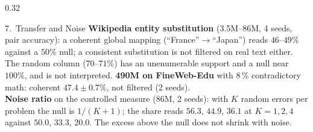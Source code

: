 \documentclass[final,t]{beamer}
\begin{document}
\begin{frame}[t,fragile]
\begin{columns}[t,totalwidth=\linewidth]
\begin{column}{0.32\linewidth}
\begin{block}{7.~Transfer and Noise}
\justifying\normalsize
\textbf{Wikipedia entity substitution} (3.5M--86M, 4 seeds, pair accuracy): a
coherent global mapping (``France''$\to$``Japan'') reads $46$--$49\%$ against
a $50\%$ null; a consistent substitution is not filtered on real text either.
The random column ($70$--$71\%$) has an unenumerable support and a null near
$100\%$, and is not interpreted. \textbf{490M on FineWeb-Edu} with 8\,\%
contradictory math: coherent $47.4 \pm 0.7\%$, not filtered (2 seeds).\\[0.3ex]
\textbf{Noise ratio} on the controlled measure (86M, 2 seeds): with $K$
random errors per problem the null is $1/(K{+}1)$; the share reads $56.3$,
$44.9$, $36.1$ at $K{=}1, 2, 4$ against $50.0$, $33.3$, $20.0$. The excess
above the null does not shrink with noise.
\end{block}

\end{column}

\end{columns}

\vspace{0.4cm}

\end{frame}
\end{document}

